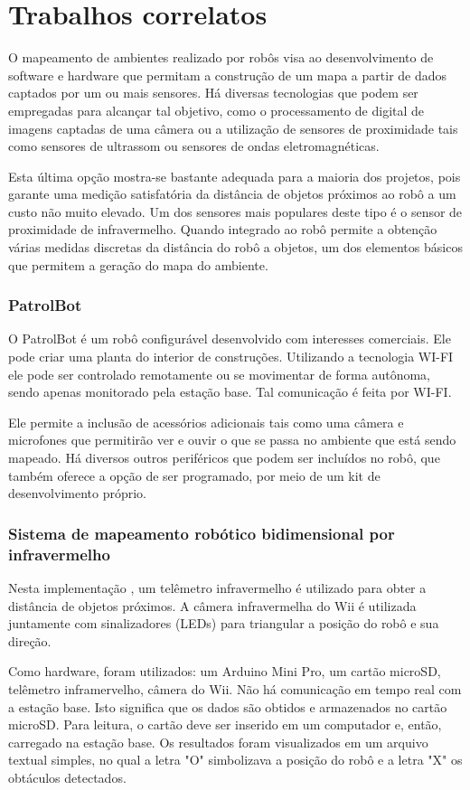 \chapter{Trabalhos correlatos}

O mapeamento de ambientes realizado por robôs visa ao desenvolvimento de software e hardware que permitam a construção de um mapa a partir de dados captados por um ou mais sensores. Há diversas tecnologias que podem ser empregadas para alcançar tal objetivo, como o processamento de digital de imagens captadas de uma câmera ou a utilização de sensores de proximidade tais como sensores de ultrassom ou sensores de ondas eletromagnéticas.

Esta última opção mostra-se bastante adequada para a maioria dos projetos, pois garante uma medição satisfatória da distância de objetos próximos ao robô a um custo não muito elevado. Um dos sensores mais populares deste tipo é o sensor de proximidade de infravermelho. Quando integrado ao robô permite a obtenção várias medidas discretas da distância do robô a objetos, um dos elementos básicos que permitem a geração do mapa do ambiente.

\subsection{PatrolBot}
O PatrolBot \cite{patrol_bot} é um robô configurável desenvolvido com interesses comerciais. Ele pode criar uma planta do interior de construções. Utilizando a tecnologia WI-FI ele pode ser controlado remotamente ou se movimentar de forma autônoma, sendo apenas monitorado pela estação base. Tal comunicação é feita por WI-FI.

Ele permite a inclusão de acessórios adicionais tais como uma câmera e microfones que permitirão ver e ouvir o que se passa no ambiente que está sendo mapeado. Há diversos outros periféricos que podem ser incluídos no robô, que também oferece a opção de ser programado, por meio de um kit de desenvolvimento próprio.

\subsection{Sistema de mapeamento robótico bidimensional por infravermelho}

Nesta implementação \cite{wii}, um telêmetro infravermelho é utilizado para obter a distância de objetos próximos. A câmera infravermelha do Wii é utilizada juntamente com sinalizadores (LEDs) para triangular a posição do robô e sua direção.

Como hardware, foram utilizados: um Arduino Mini Pro, um cartão microSD, telêmetro inframervelho, câmera do Wii. Não há comunicação em tempo real com a estação base. Isto significa que os dados são obtidos e armazenados no cartão microSD. Para leitura, o cartão deve ser inserido em um computador e, então, carregado na estação base. Os resultados foram visualizados em um arquivo textual simples, no qual a letra "O" simbolizava a posição do robô e a letra "X" os obtáculos detectados.
